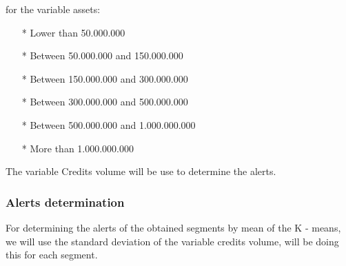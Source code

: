 for the variable assets:
\begin{itemize}
\item[*] Lower than 50.000.000
\item[*] Between 50.000.000 and 150.000.000
\item[*] Between 150.000.000 and 300.000.000
\item[*] Between 300.000.000 and 500.000.000
\item[*] Between 500.000.000 and 1.000.000.000
\item[*] More than 1.000.000.000
\end{itemize}
The variable Credits volume will be use to determine the alerts.
\subsubsection{Alerts determination}
For determining the alerts of the obtained segments by mean of the K - means, we will use the standard deviation of the variable credits volume, will be doing this for each segment.
\clearemptydoublepage
